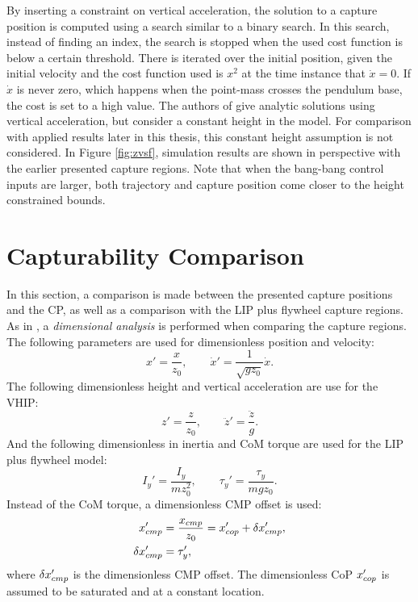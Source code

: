 By inserting a constraint on vertical acceleration, the solution to a capture position is computed using a search similar to a binary search. In this search, instead of finding an index, the search is stopped when the used cost function is below a certain threshold. There is iterated over the initial position, given the initial velocity and the cost function used is $x^2$ at the time instance that $\dot{x}=0$.  If $\dot{x}$ is never zero, which happens when the point-mass crosses the pendulum base, the cost is set to a high value. The authors of \cite{gao2017increase} give analytic solutions using vertical acceleration, but consider a constant height in the model. For comparison with applied results later in this thesis, this constant height assumption is not considered. In Figure \ref{fig:zvsf}, simulation results are shown in perspective with the earlier presented capture regions. Note that when the bang-bang control inputs are larger, both trajectory and capture position come closer to the height constrained bounds.

\section{Capturability Comparison}
In this section, a comparison is made between the presented capture positions and the \ac{CP}, as well as a comparison with the \ac{LIP} plus flywheel capture regions. As in \cite{pratt2006capture, stephens2007humanoid, koolen2012capturability}, a \textit{dimensional analysis} \cite{mcmahon1983size} is performed when comparing the capture regions. The following parameters are used for dimensionless position and velocity:
\begin{equation}
	x' = \frac{x}{z_0}, \qquad \dot{x}' = \frac{1}{\sqrt{gz_0}}\dot{x}.
\end{equation}
The following dimensionless height and vertical acceleration are use for the \ac{VHIP}:
\begin{equation}
 z' = \frac{z}{z_0}, \qquad \ddot{z}'=\frac{\ddot{z}}{g}.
\end{equation}
And the following dimensionless in inertia and \ac{CoM} torque are used for the \ac{LIP} plus flywheel model:
\begin{equation}
I_y'=\frac{I_y}{mz_0^2}, \qquad \tau_y' = \frac{\tau_y}{mgz_0}.
\end{equation}
Instead of the \ac{CoM} torque, a dimensionless \ac{CMP} offset is used:
\begin{align}
	x_{cmp}' &=\frac{x_{cmp}}{z_0}=x_{cop}' + \delta x_{cmp}',\\
	\delta x_{cmp}' &=\tau_y',
\end{align}
where $\delta x_{cmp}'$ is the dimensionless \ac{CMP} offset. The dimensionless \ac{CoP} $x_{cop}'$ is assumed to be saturated and at a constant location.

